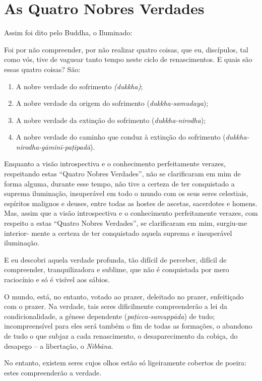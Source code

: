\chapter{As Quatro Nobres Verdades}

Assim foi dito pelo Buddha, o Iluminado:

Foi por não compreender, por não realizar quatro coisas, que eu, discípulos, tal
como vós, tive de vaguear tanto tempo neste ciclo de renascimentos. E quais são
essas quatro coisas? São:

\begin{enumerate}
  \item A nobre verdade do sofrimento \emph{(dukkha)};

  \item A nobre verdade da origem do sofrimento (\emph{dukkha-samudaya});

  \item A nobre verdade da extinção do sofrimento (\emph{dukkha-nirodha});

  \item A nobre verdade do caminho que conduz à extinção do sofrimento (\emph{dukkha-nirodha-gāminī-paṭipadā}).
\end{enumerate}


Enquanto a visão introspectiva e o conhecimento perfeitamente verazes,
respeitando estas ``Quatro Nobres Verdades'', não se clarificaram em mim de
forma alguma, durante esse tempo, não tive a certeza de ter conquistado a
suprema iluminação, insuperável em todo o mundo com os seus seres celestiais,
espíritos malignos e deuses, entre todas as hostes de ascetas, sacerdotes e
homens. Mas, assim que a visão introspectiva e o conhecimento perfeitamente
verazes, com respeito a estas ``Quatro Nobres Verdades'', se clarificaram em
mim, surgiu-me interior- mente a certeza de ter conquistado aquela suprema e
insuperável iluminação.


E eu descobri aquela verdade profunda, tão difícil de perceber, difícil de
compreender, tranquilizadora e sublime, que não é conquistada por mero
raciocínio e só é visível aos sábios.


O mundo, está, no entanto, votado ao prazer, deleitado no prazer, enfeitiçado
com o prazer. Na verdade, tais seres dificilmente compreenderão a lei da
condicionalidade, a génese dependente (\emph{paṭicca-samuppāda}) de tudo;
incompreensível para eles será também o fim de todas as formações, o abandono de
tudo o que subjaz a cada renascimento, o desaparecimento da cobiça, do desapego
-- a libertação, o \emph{Nibbāna}.

No entanto, existem seres cujos olhos estão só ligeiramente cobertos de poeira:
estes compreenderão a verdade.

